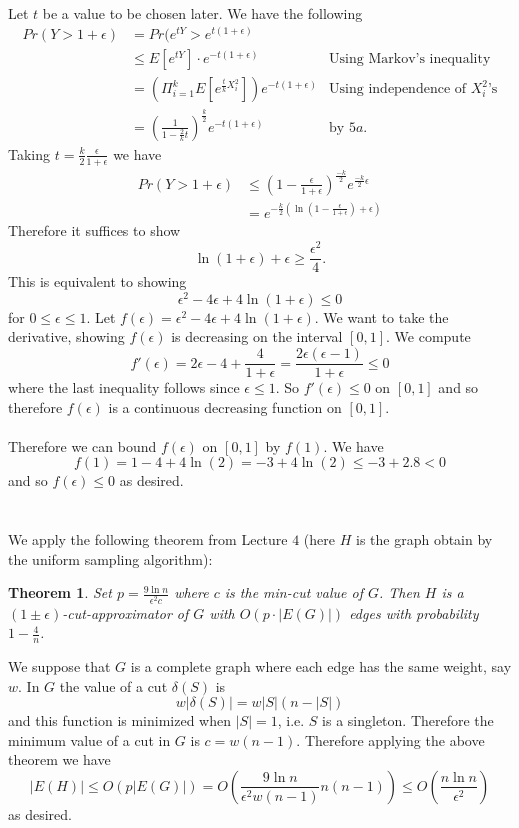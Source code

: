 \documentclass[letterpaper,12pt,oneside,onecolumn]{article}
\newtheorem{theorem}[fact]{Theorem}
\begin{document}
\paragraph{}
Let $t$ be a value to be chosen later. We have the following
\begin{align*}
Pr(Y > 1+\epsilon) &= Pr(e^{tY}> e^{t(1+\epsilon)} \\
&\leq E[e^{tY}]\cdot e^{-t(1+\epsilon)}  &\text{Using Markov's inequality} \\
&= (\Pi_{i=1}^k E[e^{\frac{t}{k}X_i^2}])e^{-t(1+\epsilon)} &\text{Using independence of $X_i^2$'s} \\
&=(\frac{1}{1-\frac{2}{k}t})^{\frac{k}{2}}e^{-t(1+\epsilon)} &\text{by $5a$}.
\end{align*}
Taking $t=\frac{k}{2}\frac{\epsilon}{1+\epsilon}$ we have
\begin{align*}
Pr(Y>1+\epsilon) &\leq (1 - \frac{\epsilon}{1+\epsilon})^\frac{-k}{2}e^{\frac{-k}{2}\epsilon}\\
&=e^{-\frac{k}{2}(\ln(1-\frac{\epsilon}{1+\epsilon}) + \epsilon)}
\end{align*}
Therefore it suffices to show $$\ln(1+\epsilon) + \epsilon \geq \frac{\epsilon^2}{4}.$$
This is equivalent to showing
$$\epsilon^2 - 4\epsilon +4\ln(1+\epsilon) \leq 0$$
for $0 \leq \epsilon \leq 1$.
Let $f(\epsilon) = \epsilon^2 - 4\epsilon +4\ln(1+\epsilon)$. We want to take the derivative, showing $f(\epsilon)$ is decreasing on the interval $[0,1]$.
We compute
$$f'(\epsilon) = 2\epsilon - 4 + \frac{4}{1+\epsilon} = \frac{2\epsilon(\epsilon-1)}{1+\epsilon} \leq 0$$
where the last inequality follows since $\epsilon \leq 1$. So $f'(\epsilon) \leq 0$ on $[0,1]$ and so therefore $f(\epsilon)$ is a continuous decreasing function on $[0,1]$.
\paragraph{}
Therefore we can bound $f(\epsilon)$ on $[0,1]$ by $f(1)$. We have
$$f(1) = 1 - 4 + 4\ln(2) = -3 + 4\ln(2) \leq -3 +2.8 <0$$
and so $f(\epsilon) \leq 0$ as desired.
\newpage
\section{}
\paragraph{}
We apply the following theorem from Lecture $4$ (here $H$ is the graph obtain by the uniform sampling algorithm):
\begin{theorem}
	Set $p=\frac{9\ln n}{\epsilon^2 c}$ where $c$ is the min-cut value of $G$. Then $H$ is a $(1\pm \epsilon)$-cut-approximator of $G$ with $O(p\cdot |E(G)|)$ edges with probability $1-\frac{4}{n}$.
\end{theorem}
We suppose that $G$ is a complete graph where each edge has the same weight, say $w$. In $G$ the value of a cut $\delta(S)$ is
$$w|\delta(S)| = w|S|(n-|S|)$$
and this function is minimized when $|S| = 1$, i.e. $S$ is a singleton. Therefore the minimum value of a cut in $G$ is $c = w(n-1)$. Therefore applying the above theorem we have
$$|E(H)| \leq O(p|E(G)|) = O(\frac{9\ln n}{\epsilon^2 w (n-1)}n(n-1)) \leq O(\frac{n\ln n}{\epsilon^2})$$
as desired.
\end{document}

